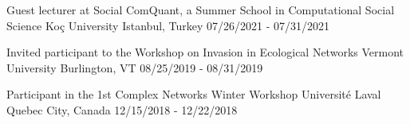 

\begin{cventries}

  \cventrytwo
    {Guest lecturer at Social ComQuant, a Summer School in Computational Social Science } %
    {Koç University} %
    {Istanbul, Turkey} %
    {07/26/2021 - 07/31/2021} %
    {}
    {\begin{cvitems} 
	\end{cvitems}}
\vspace{-3mm}

  \cventrytwo
    {Invited participant to the Workshop on Invasion in Ecological Networks} %
    {Vermont University} %
    {Burlington, VT} %
    {08/25/2019 - 08/31/2019} %
    {}
    {\begin{cvitems} 
	\end{cvitems}}
    
\vspace{-3mm}

  \cventrytwo
    {Participant in the 1st Complex Networks Winter Workshop} %
    {Universit\'e Laval} %
    {Quebec City, Canada} %
    {12/15/2018 - 12/22/2018} %
    {}
	{
    \begin{cvitems} 
	\end{cvitems}      
    }
\vspace{-3mm}


\end{cventries}
